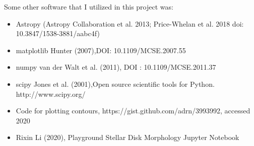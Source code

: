 \documentclass{aastex63}
\begin{document}
Some other software that I utilized in this project was:
\begin{itemize}
    \item Astropy (Astropy Collaboration et al. 2013; Price-Whelan et al. 2018 doi: 10.3847/1538-3881/aabc4f)
    \item matplotlib Hunter (2007),DOI: 10.1109/MCSE.2007.55
    \item numpy van der Walt et al. (2011), DOI : 10.1109/MCSE.2011.37
    \item scipy Jones et al. (2001),Open source scientific tools for Python. http://www.scipy.org/
    \item Code for plotting contours, https://gist.github.com/adrn/3993992, accessed 2020
    \item Rixin Li (2020), Playground Stellar Disk Morphology Jupyter Notebook
    
\end{itemize}

{}

\end{document}
